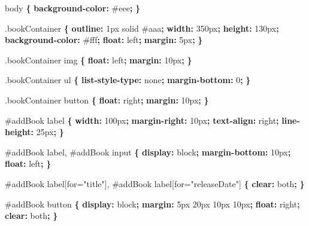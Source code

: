 \documentclass[9pt]{book}
\newenvironment{Shaded}{}{}
\newcommand{\KeywordTok}[1]{\textcolor[rgb]{0.00,0.44,0.13}{\textbf{{#1}}}}
\newcommand{\DataTypeTok}[1]{\textcolor[rgb]{0.56,0.13,0.00}{{#1}}}
\newcommand{\FloatTok}[1]{\textcolor[rgb]{0.25,0.63,0.44}{{#1}}}
\newcommand{\CharTok}[1]{\textcolor[rgb]{0.25,0.44,0.63}{{#1}}}
\newcommand{\StringTok}[1]{\textcolor[rgb]{0.25,0.44,0.63}{{#1}}}
\newcommand{\NormalTok}[1]{{#1}}
\begin{document}
\begin{Shaded}
\begin{Highlighting}[]
\NormalTok{body }\KeywordTok{\{}
    \KeywordTok{background-color:} \DataTypeTok{#eee}\KeywordTok{;}
\KeywordTok{\}}

\FloatTok{.bookContainer} \KeywordTok{\{}
    \KeywordTok{outline:} \DataTypeTok{1px} \DataTypeTok{solid} \DataTypeTok{#aaa}\KeywordTok{;}
    \KeywordTok{width:} \DataTypeTok{350px}\KeywordTok{;}
    \KeywordTok{height:} \DataTypeTok{130px}\KeywordTok{;}
    \KeywordTok{background-color:} \DataTypeTok{#fff}\KeywordTok{;}
    \KeywordTok{float:} \DataTypeTok{left}\KeywordTok{;}
    \KeywordTok{margin:} \DataTypeTok{5px}\KeywordTok{;}
\KeywordTok{\}}

\FloatTok{.bookContainer} \NormalTok{img }\KeywordTok{\{}
    \KeywordTok{float:} \DataTypeTok{left}\KeywordTok{;}
    \KeywordTok{margin:} \DataTypeTok{10px}\KeywordTok{;}
\KeywordTok{\}}

\FloatTok{.bookContainer} \NormalTok{ul }\KeywordTok{\{}
    \KeywordTok{list-style-type:} \DataTypeTok{none}\KeywordTok{;}
    \KeywordTok{margin-bottom:} \DataTypeTok{0}\KeywordTok{;}
\KeywordTok{\}}

\FloatTok{.bookContainer} \NormalTok{button }\KeywordTok{\{}
    \KeywordTok{float:} \DataTypeTok{right}\KeywordTok{;}
    \KeywordTok{margin:} \DataTypeTok{10px}\KeywordTok{;}
\KeywordTok{\}}

\FloatTok{#addBook} \NormalTok{label }\KeywordTok{\{}
    \KeywordTok{width:} \DataTypeTok{100px}\KeywordTok{;}
    \KeywordTok{margin-right:} \DataTypeTok{10px}\KeywordTok{;}
    \KeywordTok{text-align:} \DataTypeTok{right}\KeywordTok{;}
    \KeywordTok{line-height:} \DataTypeTok{25px}\KeywordTok{;}
\KeywordTok{\}}

\FloatTok{#addBook} \NormalTok{label, }\FloatTok{#addBook} \NormalTok{input }\KeywordTok{\{}
    \KeywordTok{display:} \DataTypeTok{block}\KeywordTok{;}
    \KeywordTok{margin-bottom:} \DataTypeTok{10px}\KeywordTok{;}
    \KeywordTok{float:} \DataTypeTok{left}\KeywordTok{;}
\KeywordTok{\}}

\FloatTok{#addBook} \NormalTok{label}\CharTok{[for=}\StringTok{"title"}\CharTok{]}\NormalTok{, }\FloatTok{#addBook} \NormalTok{label}\CharTok{[for=}\StringTok{"releaseDate"}\CharTok{]} \KeywordTok{\{}
    \KeywordTok{clear:} \DataTypeTok{both}\KeywordTok{;}
\KeywordTok{\}}

\FloatTok{#addBook} \NormalTok{button }\KeywordTok{\{}
    \KeywordTok{display:} \DataTypeTok{block}\KeywordTok{;}
    \KeywordTok{margin:} \DataTypeTok{5px} \DataTypeTok{20px} \DataTypeTok{10px} \DataTypeTok{10px}\KeywordTok{;}
    \KeywordTok{float:} \DataTypeTok{right}\KeywordTok{;}
    \KeywordTok{clear:} \DataTypeTok{both}\KeywordTok{;}
\KeywordTok{\}}


\end{Highlighting}
\end{Shaded}
\end{document}

